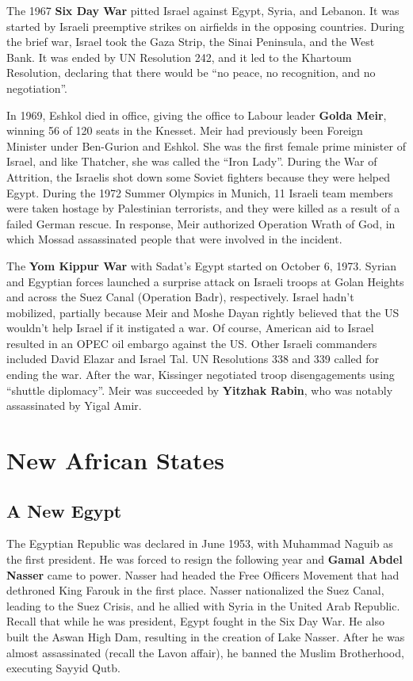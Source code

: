 The 1967 \textbf{Six Day War} pitted Israel against Egypt, Syria, and Lebanon.
It was started by Israeli preemptive strikes on airfields in the opposing countries.
During the brief war, Israel took the Gaza Strip, the Sinai Peninsula, and the West Bank.
It was ended by UN Resolution 242, and it led to the Khartoum Resolution,
declaring that there would be ``no peace, no recognition, and no negotiation''.

In 1969, Eshkol died in office, giving the office to Labour leader \textbf{Golda Meir},
winning 56 of 120 seats in the Knesset.
Meir had previously been Foreign Minister under Ben-Gurion and Eshkol.
She was the first female prime minister of Israel, and like Thatcher, she was called the ``Iron Lady''.
During the War of Attrition, the Israelis shot down some Soviet fighters because they were helped Egypt.
During the 1972 Summer Olympics in Munich, 11 Israeli team members were taken hostage by Palestinian terrorists,
and they were killed as a result of a failed German rescue.
In response, Meir authorized Operation Wrath of God,
in which Mossad assassinated people that were involved in the incident.

The \textbf{Yom Kippur War} with Sadat's Egypt started on October 6, 1973.
Syrian and Egyptian forces launched a surprise attack on Israeli troops
at Golan Heights and across the Suez Canal (Operation Badr), respectively.
Israel hadn't mobilized, partially because Meir and Moshe Dayan rightly believed
that the US wouldn't help Israel if it instigated a war.
Of course, American aid to Israel resulted in an OPEC oil embargo against the US\@.
Other Israeli commanders included David Elazar and Israel Tal.
UN Resolutions 338 and 339 called for ending the war.
After the war, Kissinger negotiated troop disengagements using ``shuttle diplomacy''.
Meir was succeeded by \textbf{Yitzhak Rabin}, who was notably assassinated by Yigal Amir.

\section{New African States}

\subsection*{A New Egypt}

The Egyptian Republic was declared in June 1953, with Muhammad Naguib as the first president.
He was forced to resign the following year and \textbf{Gamal Abdel Nasser} came to power.
Nasser had headed the Free Officers Movement that had dethroned King Farouk in the first place.
Nasser nationalized the Suez Canal, leading to the Suez Crisis,
and he allied with Syria in the United Arab Republic.
Recall that while he was president, Egypt fought in the Six Day War.
He also built the Aswan High Dam, resulting in the creation of Lake Nasser.
After he was almost assassinated (recall the Lavon affair), he banned the Muslim Brotherhood,
executing Sayyid Qutb.

